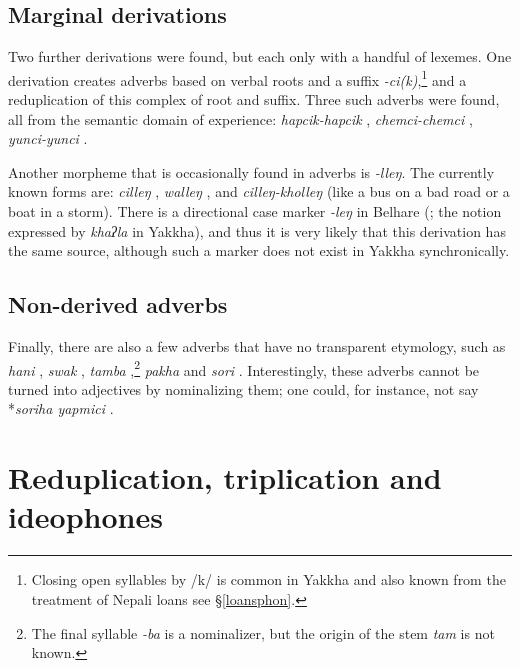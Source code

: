 \subsection{Marginal derivations}

Two further derivations were found, but each only with a handful of lexemes. One derivation creates adverbs based on verbal roots and a suffix \emph{-ci(k)},\footnote{Closing open syllables by /k/ is common in Yakkha and also known from the treatment of Nepali loans see §\ref{loansphon}.} and a reduplication of this complex of root and suffix. Three such adverbs were found, all from the semantic domain of experience:   \emph{hapcik-hapcik} , \emph{chemci-chemci} , \emph{yunci-yunci} .

Another morpheme that is occasionally found  in adverbs is \emph{-lleŋ}. The currently known forms are: \emph{cilleŋ} , \emph{walleŋ} , and \emph{cilleŋ-kholleŋ}  (like a bus on a bad road or a boat in a storm).
There is a  directional case marker \emph{-leŋ} in Belhare (\citealt{Bickel2003Belhare}; the notion expressed by \emph{khaʔla} in Yakkha), and thus it is very likely that this derivation has the same source, although such a marker does not exist in Yakkha synchronically.

\subsection{Non-derived adverbs}

Finally, there are also a few adverbs that have no transparent etymology, such as \emph{hani} , \emph{swak} , \emph{tamba} ,\footnote{The final syllable \emph{-ba} is a nominalizer, but the origin of the stem \emph{tam} is not known.} \emph{pakha}  and \emph{sori} . Interestingly, these adverbs cannot be turned into adjectives by nominalizing them; one could, for instance, not say *\emph{soriha yapmici} .

\section{Reduplication, triplication and ideophones}\label{redup}

